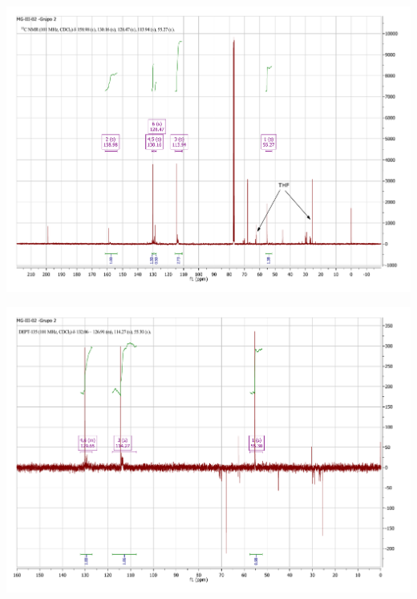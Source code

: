 \documentclass[fleqn,11pt]{SelfArx}
\begin{document}
{
	\begin{minipage}{\textheight}
		\centering
		\includegraphics[height=0.7\textheight]{RMN/C.pdf}
		\label{CHRM}
	\end{minipage}
}

{
	\begin{minipage}{\textheight}
		\centering
		\includegraphics[height=0.7\textheight]{RMN/DEPT.pdf}
		\label{DEPT}
	\end{minipage}
}
\end{document}
